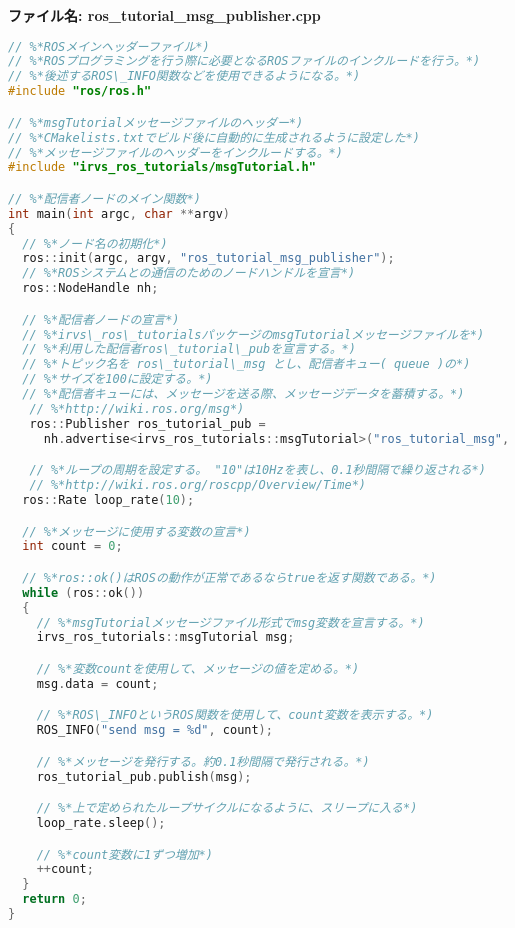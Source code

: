 \noindent\textbf{ファイル名: ros\_tutorial\_msg\_publisher.cpp}
\begin{lstlisting}[language=C++]
// %*ROSメインヘッダーファイル*)
// %*ROSプログラミングを行う際に必要となるROSファイルのインクルードを行う。*)
// %*後述するROS\_INFO関数などを使用できるようになる。*)
#include "ros/ros.h"

// %*msgTutorialメッセージファイルのヘッダー*)
// %*CMakelists.txtでビルド後に自動的に生成されるように設定した*)
// %*メッセージファイルのヘッダーをインクルードする。*)
#include "irvs_ros_tutorials/msgTutorial.h"

// %*配信者ノードのメイン関数*)
int main(int argc, char **argv)
{
  // %*ノード名の初期化*)
  ros::init(argc, argv, "ros_tutorial_msg_publisher");
  // %*ROSシステムとの通信のためのノードハンドルを宣言*)
  ros::NodeHandle nh;

  // %*配信者ノードの宣言*)
  // %*irvs\_ros\_tutorialsパッケージのmsgTutorialメッセージファイルを*)
  // %*利用した配信者ros\_tutorial\_pubを宣言する。*)
  // %*トピック名を ros\_tutorial\_msg とし、配信者キュー( queue )の*)
  // %*サイズを100に設定する。*)
  // %*配信者キューには、メッセージを送る際、メッセージデータを蓄積する。*)
   // %*http://wiki.ros.org/msg*)
   ros::Publisher ros_tutorial_pub =
     nh.advertise<irvs_ros_tutorials::msgTutorial>("ros_tutorial_msg", 100);

   // %*ループの周期を設定する。 "10"は10Hzを表し、0.1秒間隔で繰り返される*)
   // %*http://wiki.ros.org/roscpp/Overview/Time*)
  ros::Rate loop_rate(10);

  // %*メッセージに使用する変数の宣言*)
  int count = 0;

  // %*ros::ok()はROSの動作が正常であるならtrueを返す関数である。*)
  while (ros::ok())
  {
    // %*msgTutorialメッセージファイル形式でmsg変数を宣言する。*)
    irvs_ros_tutorials::msgTutorial msg;

    // %*変数countを使用して、メッセージの値を定める。*)
    msg.data = count;

    // %*ROS\_INFOというROS関数を使用して、count変数を表示する。*)
    ROS_INFO("send msg = %d", count);

    // %*メッセージを発行する。約0.1秒間隔で発行される。*)
    ros_tutorial_pub.publish(msg);

    // %*上で定められたループサイクルになるように、スリープに入る*)
    loop_rate.sleep();

    // %*count変数に1ずつ増加*)
    ++count;
  }
  return 0;
}
\end{lstlisting}


